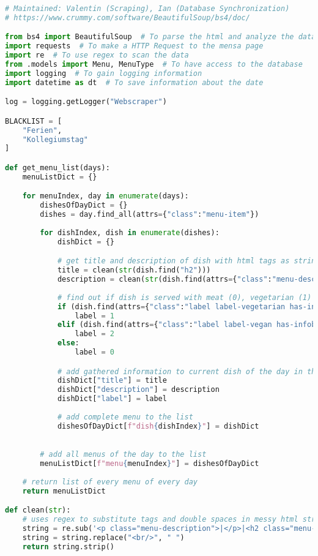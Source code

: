 \begin{lstlisting}[language=Python]
# Maintained: Valentin (Scraping), Ian (Database Synchronization)
# https://www.crummy.com/software/BeautifulSoup/bs4/doc/

from bs4 import BeautifulSoup  # To parse the html and analyze the data
import requests  # To make a HTTP Request to the mensa page
import re  # To use regex to scan the data
from .models import Menu, MenuType  # To have access to the database
import logging  # To gain logging information
import datetime as dt  # To save information about the date

log = logging.getLogger("Webscraper")

BLACKLIST = [
    "Ferien",
    "Kollegiumstag"
]

def get_menu_list(days):
    menuListDict = {}

    for menuIndex, day in enumerate(days):
        dishesOfDayDict = {}
        dishes = day.find_all(attrs={"class":"menu-item"})
        
        for dishIndex, dish in enumerate(dishes):
            dishDict = {}

            # get title and description of dish with html tags as strings and using the "clean()" function to remove tags and double spaces
            title = clean(str(dish.find("h2")))
            description = clean(str(dish.find(attrs={"class":"menu-description"})))
            
            # find out if dish is served with meat (0), vegetarian (1) or vegan (2)
            if (dish.find(attrs={"class":"label label-vegetarian has-infobox"}) is not None):
                label = 1
            elif (dish.find(attrs={"class":"label label-vegan has-infobox"}) is not None):
                label = 2
            else:
                label = 0

            # add gathered information to current dish of the day in the list
            dishDict["title"] = title
            dishDict["description"] = description
            dishDict["label"] = label
            
            # add complete menu to the list
            dishesOfDayDict[f"dish{dishIndex}"] = dishDict

        
        # add all menus of the day to the list
        menuListDict[f"menu{menuIndex}"] = dishesOfDayDict
    
    # return list of every menu of every day
    return menuListDict

def clean(str):
    # uses regex to substitute tags and double spaces in messy html string with empty strings or single spaces
    string = re.sub('<p class="menu-description">|</p>|<h2 class="menu-title">|</h2>|\\xad\s*|\\n', '', str)
    string = string.replace("<br/>", " ")
    return string.strip()


\end{lstlisting}
